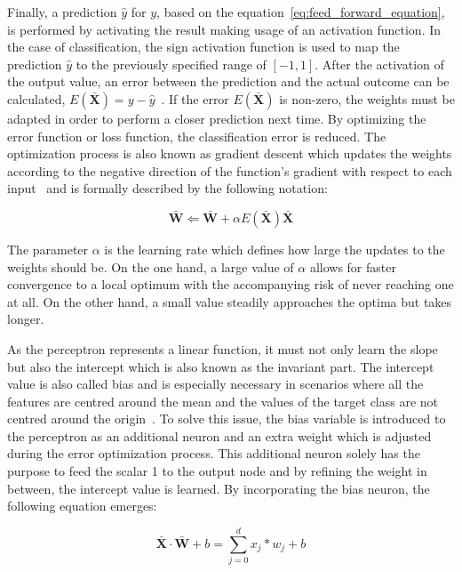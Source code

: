 \documentclass[draft,final]{vutinfth} %
\newcommand{\p}[1]{see p. #1}
\begin{document}
    Finally, a prediction $\hat{y}$ for $y$, based on the equation~\eqref{eq:feed_forward_equation}, is performed by activating the result making usage of an activation function.
    In the case of classification, the sign activation function is used to map the prediction $\hat{y}$ to the previously specified range of $[-1,1]$.
    After the activation of the output value, an error between the prediction and the actual outcome can be calculated, $E(\bar{\boldsymbol{X}}) = y - \hat{y}$~\citep[\p{5ff}]{aggarwal_neural_2018}.
    If the error $E(\bar{\boldsymbol{X}})$ is non-zero, the weights must be adapted in order to perform a closer prediction next time.
    By optimizing the error function or loss function, the classification error is reduced.
    The optimization process is also known as gradient descent which updates the weights according to the negative direction of the function's gradient with respect to each input~\citep[\p{7}]{aggarwal_neural_2018} and is formally described by the following notation:

    \begin{equation}
        \bar{\boldsymbol{W}} \Leftarrow \bar{\boldsymbol{W}} + \alpha E(\bar{\boldsymbol{X}})\bar{\boldsymbol{X}}\label{eq:weight_adjusting}
    \end{equation}

    The parameter $\alpha$ is the learning rate which defines how large the updates to the weights should be.
    On the one hand, a large value of $\alpha$ allows for faster convergence to a local optimum with the accompanying risk of never reaching one at all.
    On the other hand, a small value steadily approaches the optima but takes longer.


    As the perceptron represents a linear function, it must not only learn the slope but also the intercept which is also known as the invariant part.
    The intercept value is also called bias and is especially necessary in scenarios where all the features are centred around the mean and the values of the target class are not centred around the origin~\citep[\p{6}]{aggarwal_neural_2018}.
    To solve this issue, the bias variable is introduced to the perceptron as an additional neuron and an extra weight which is adjusted during the error optimization process.
    This additional neuron solely has the purpose to feed the scalar 1 to the output node and by refining the weight in between, the intercept value is learned.
    By incorporating the bias neuron, the following equation emerges:

    \begin{equation}
        \bar{\boldsymbol{X}}\cdot\bar{\boldsymbol{W}} + b=\sum_{j=0}^{d}x_j*w_j + b\label{eq:linear_function_equation}
    \end{equation}
\end{document}
